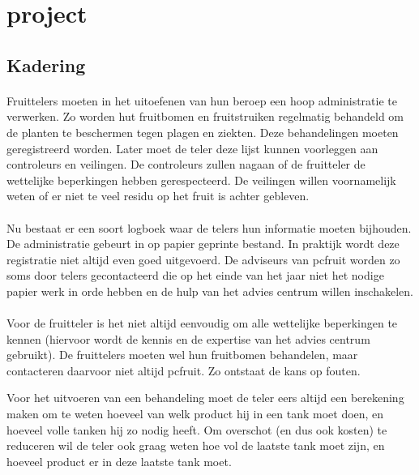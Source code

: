 \section {project}

\subsection {Kadering}

\paragraph {} Fruittelers moeten in het uitoefenen van hun beroep een hoop administratie
te verwerken. Zo worden hut fruitbomen en fruitstruiken regelmatig behandeld om de planten
te beschermen tegen plagen en ziekten. Deze behandelingen moeten geregistreerd worden.
Later moet de teler deze lijst kunnen voorleggen aan controleurs en veilingen. De
controleurs zullen nagaan of de fruitteler de wettelijke beperkingen hebben gerespecteerd.
De veilingen willen voornamelijk weten of er niet te veel residu op het fruit is achter
gebleven.

\paragraph {} Nu bestaat er een soort logboek waar de telers hun informatie moeten
bijhouden. De administratie gebeurt in op papier geprinte bestand. In praktijk wordt deze
registratie niet altijd even goed uitgevoerd. De adviseurs van pcfruit worden zo soms door
telers gecontacteerd die op het einde van het jaar niet het nodige papier werk in orde
hebben en de hulp van het advies centrum willen inschakelen.

\paragraph {} Voor de fruitteler is het niet altijd eenvoudig om alle wettelijke
beperkingen te kennen (hiervoor wordt de kennis en de expertise van het advies centrum
gebruikt). De fruittelers moeten wel hun fruitbomen behandelen, maar contacteren daarvoor
niet altijd pcfruit. Zo ontstaat de kans op fouten.

Voor het uitvoeren van een behandeling moet de teler eers altijd een berekening maken om
te weten hoeveel van welk product hij in een tank moet doen, en hoeveel volle tanken hij
zo nodig heeft. Om overschot (en dus ook kosten) te reduceren wil de teler ook graag weten
hoe vol de laatste tank moet zijn, en hoeveel product er in deze laatste tank moet.

